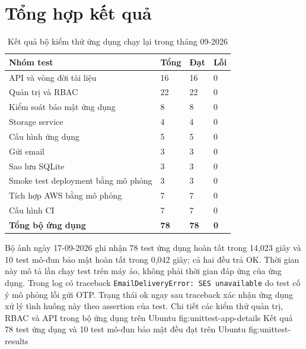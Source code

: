 \section{Tổng hợp kết quả}
\begin{table}[htbp]\centering\small
\caption{Kết quả bộ kiểm thử ứng dụng chạy lại trong tháng 09-2026}
\begin{tabularx}{\textwidth}{X P{1.5cm}P{1.5cm}P{1.5cm}}\toprule
\textbf{Nhóm test}&\textbf{Tổng}&\textbf{Đạt}&\textbf{Lỗi}\\\midrule
API và vòng đời tài liệu &16&16&0\\
Quản trị và RBAC &22&22&0\\
Kiểm soát bảo mật ứng dụng &8&8&0\\
Storage service &4&4&0\\
Cấu hình ứng dụng &5&5&0\\
Gửi email &3&3&0\\
Sao lưu SQLite &3&3&0\\
Smoke test deployment bằng mô phỏng &3&3&0\\
Tích hợp AWS bằng mô phỏng &7&7&0\\
Cấu hình CI &7&7&0\\\midrule
\textbf{Tổng bộ ứng dụng}&\textbf{78}&\textbf{78}&\textbf{0}\\\bottomrule
\end{tabularx}\end{table}
Bộ ảnh ngày 17-09-2026 ghi nhận 78 test ứng dụng hoàn tất trong 14,023 giây và 10 test mô-đun bảo mật hoàn tất trong 0,042 giây; cả hai đều trả OK. Thời gian này mô tả lần chạy test trên máy ảo, không phải thời gian đáp ứng của ứng dụng. Trong log có traceback \texttt{EmailDeliveryError: SES unavailable} do test cố ý mô phỏng lỗi gửi OTP. Trạng thái ok ngay sau traceback xác nhận ứng dụng xử lý tình huống này theo assertion của test.
{Chi tiết các kiểm thử quản trị, RBAC và API trong bộ ứng dụng trên Ubuntu}
{fig:unittest-app-details}
{Kết quả 78 test ứng dụng và 10 test mô-đun bảo mật đều đạt trên Ubuntu}
{fig:unittest-results}
